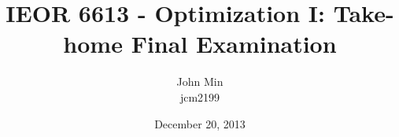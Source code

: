 \documentclass{article}
\begin{document}
\title{IEOR 6613 - Optimization I: Take-home Final Examination}

\author{John Min\\ jcm2199}
\date{December 20, 2013}
\maketitle
\end{document}
